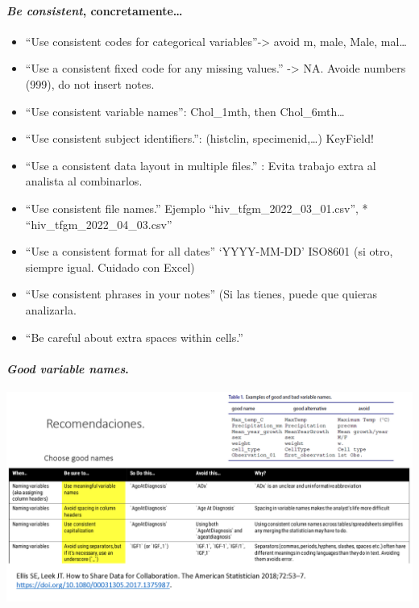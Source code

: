 \documentclass[
  letterpaper,
  DIV=11,
  numbers=noendperiod]{scrreprt}
\let\oldparagraph\paragraph
\renewcommand{\paragraph}[1]{\oldparagraph{#1}\mbox{}}
\providecommand{\tightlist}{%
  \setlength{\itemsep}{0pt}\setlength{\parskip}{0pt}}\usepackage{longtable,booktabs,array}
\begin{document}
\hypertarget{be-consistent-concretamente}{%
\paragraph{\texorpdfstring{\emph{Be consistent},
concretamente\ldots{}}{Be consistent, concretamente\ldots{}}}\label{be-consistent-concretamente}}

\begin{itemize}
\tightlist
\item
  ``Use consistent codes for categorical variables''-\textgreater{}
  avoid m, male, Male, mal\ldots{}
\item
  ``Use a consistent fixed code for any missing values.''
  -\textgreater{} NA. Avoide numbers (999), do not insert notes.
\item
  ``Use consistent variable names'': Chol\_1mth, then Chol\_6mth\ldots{}
\item
  ``Use consistent subject identifiers.'': (histclin, specimenid,\ldots)
  KeyField!
\item
  ``Use a consistent data layout in multiple files.'' : Evita trabajo
  extra al analista al combinarlos.
\item
  ``Use consistent file names.'' Ejemplo
  ``hiv\_tfgm\_2022\_03\_01.csv'', * ``hiv\_tfgm\_2022\_04\_03.csv''
\item
  ``Use a consistent format for all dates'' `YYYY-MM-DD' ISO8601 (si
  otro, siempre igual. Cuidado con Excel)
\item
  ``Use consistent phrases in your notes'' (Si las tienes, puede que
  quieras analizarla.
\item
  ``Be careful about extra spaces within cells.''
\end{itemize}

\hypertarget{good-variable-names.}{%
\paragraph{\texorpdfstring{\emph{Good variable
names}.}{Good variable names.}}\label{good-variable-names.}}

\includegraphics{./pics/Recom1.png}
\end{document}

